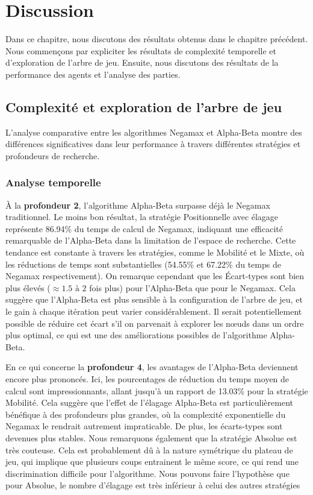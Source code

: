 \chapter{Discussion}
\label{chap:discussion}

Dans ce chapitre, nous discutons des résultats obtenus dans le chapitre précédent. Nous commençons par expliciter les résultats de complexité temporelle et d'exploration de l'arbre de jeu. Ensuite, nous discutons des résultats de la performance des agents et l'analyse des parties.

\section{Complexité et exploration de l'arbre de jeu}
L'analyse comparative entre les algorithmes Negamax et Alpha-Beta montre des différences significatives dans leur performance à travers différentes stratégies et profondeurs de recherche.

\subsection{Analyse temporelle}
À la \textbf{profondeur 2}, l'algorithme Alpha-Beta surpasse déjà le Negamax traditionnel. Le moins bon résultat, la  stratégie Positionnelle avec élagage représente 86.94\% du temps de calcul de Negamax, indiquant une efficacité remarquable de l'Alpha-Beta dans la limitation de l'espace de recherche. Cette tendance est constante à travers les stratégies, comme le Mobilité et le Mixte, où les réductions de temps sont substantielles (54.55\% et 67.22\% du temps de Negamax respectivement). On remarque cependant que les Écart-types sont bien plus élevés ($\approx 1.5 \,\, \text{à} \,\, 2$ fois plus) pour l'Alpha-Beta que pour le Negamax. Cela suggère que l'Alpha-Beta est plus sensible à la configuration de l'arbre de jeu, et le gain à chaque itération peut varier considérablement. Il serait potentiellement possible de réduire cet écart s'il on parvenait à explorer les nœuds dans un ordre plus optimal, ce qui est une des améliorations possibles de l'algorithme Alpha-Beta.

En ce qui concerne la \textbf{profondeur 4}, les avantages de l'Alpha-Beta deviennent encore plus prononcés. Ici, les pourcentages de réduction du temps moyen de calcul sont impressionnants, allant jusqu'à un rapport de 13.03\% pour la stratégie Mobilité. Cela suggère que l'effet de l'élagage Alpha-Beta est particulièrement bénéfique à des profondeurs plus grandes, où la complexité exponentielle du Negamax le rendrait autrement impraticable. De plus, les écarts-types sont devenues plus stables. Nous remarquons également que la stratégie Absolue est très couteuse. Cela est probablement dû à la nature symétrique du plateau de jeu, qui implique que plusieurs coups entrainent le même score, ce qui rend une discrimination difficile pour l'algorithme. Nous pouvons faire l'hypothèse que pour Absolue, le nombre d'élagage est très inférieur à celui des autres stratégies

